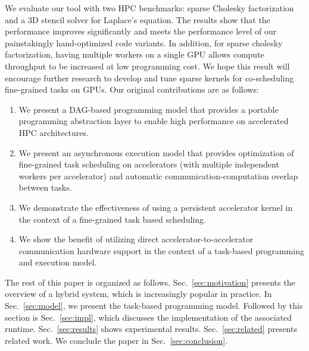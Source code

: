 We evaluate our tool with two HPC benchmarks: sparse Cholesky factorization and a 3D stencil solver for Laplace's equation.
The results show that the performance improves significantly and meets the performance level of our painstakingly hand-optimized code variants.
In addition, for sparse cholesky factorization, having multiple workers on a single GPU allows compute throughput to be increased at low programming cost. 
We hope this result will encourage further research to develop and tune sparse kernels for co-scheduling fine-grained tasks on GPUs.
Our original contributions are as follows:
\vspace{-0mm}
\begin{enumerate}
	\item We present a DAG-based programming model that provides a portable programming abstraction layer to enable high performance on accelerated HPC architectures.
	\item We present an asynchronous execution model that provides optimization of fine-grained task scheduling on accelerators (with multiple independent workers per accelerator) and automatic communication-computation overlap between tasks.
	\item We demonstrate the effectiveness of using a persistent accelerator kernel in the context of a fine-grained task based scheduling.
	\item We show the benefit of utilizing direct accelerator-to-accelerator communication hardware support in the context of a task-based programming and execution model.
\end{enumerate}

The rest of this paper is organized as follows.
Sec.~\ref{sec:motivation} presents the overview of a hybrid system, which is increasingly popular in practice.
In Sec.~\ref{sec:model}, we present the task-based programming model.
Followed by this section is Sec.~\ref{sec:impl}, which discusses the implementation of the associated runtime.
Sec.~\ref{sec:results} shows experimental results.
Sec.~\ref{sec:related} presents related work.
We conclude the paper in Sec.~\ref{sec:conclusion}.
